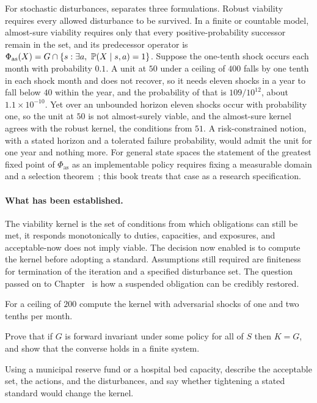 For stochastic disturbances,  separates three formulations. Robust viability requires every allowed disturbance to be survived. In a finite or countable model, almost-sure viability requires only that every positive-probability successor remain in the set, and its predecessor operator is $\Phi_{\mathrm{as}}(X)=G\cap\{s:\exists a,\ \Prob(X\mid s,a)=1\}$. Suppose the one-tenth shock occurs each month with probability $0.1$. A unit at $50$ under a ceiling of $400$ falls by one tenth in each shock month and does not recover, so it needs eleven shocks in a year to fall below $40$ within the year, and the probability of that is $109/10^{12}$, about $1.1\times 10^{-10}$. Yet over an unbounded horizon eleven shocks occur with probability one, so the unit at $50$ is not almost-surely viable, and the almost-sure kernel agrees with the robust kernel, the conditions from $51$. A risk-constrained notion, with a stated horizon and a tolerated failure probability, would admit the unit for one year and nothing more. For general state spaces the statement of the greatest fixed point of $\Phi_{\mathrm{as}}$ as an implementable policy requires fixing a measurable domain and a selection theorem~\cite{bertsekas1978}; this book treats that case as a research specification.

\paragraph{What has been established.} The viability kernel is the set of conditions from which obligations can still be met, it responds monotonically to duties, capacities, and exposures, and acceptable-now does not imply viable. The decision now enabled is to compute the kernel before adopting a standard. Assumptions still required are finiteness for termination of the iteration and a specified disturbance set. The question passed on to Chapter~ is how a suspended obligation can be credibly restored.

\begin{exercise}
For a ceiling of $200$ compute the kernel with adversarial shocks of one and two tenths per month.
\end{exercise}
\begin{exercise}
Prove that if $G$ is forward invariant under some policy for all of $S$ then $K=G$, and show that the converse holds in a finite system.
\end{exercise}
\begin{exercise}
Using a municipal reserve fund or a hospital bed capacity, describe the acceptable set, the actions, and the disturbances, and say whether tightening a stated standard would change the kernel.
\end{exercise}


